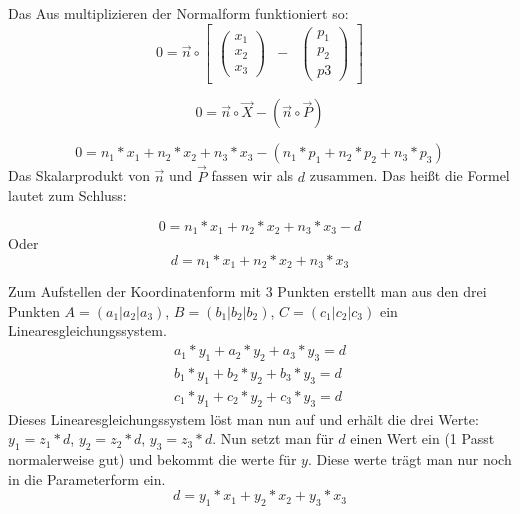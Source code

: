 \documentclass{article}
\begin{document}
Das Aus multiplizieren der Normalform funktioniert so:
\begin{equation}
0 = \vec{n} \circ \begin{bmatrix} \begin{pmatrix} x_1 \\ x_2 \\ x_3 \end{pmatrix} &  - &  \begin{pmatrix} p_1 \\ p_2 \\ p3 \end{pmatrix} \end{bmatrix}
\end{equation}

\begin{equation}
0 = \vec{n} \circ \vec{X} - (\vec{n} \circ \vec{P})
\end{equation}

\begin{equation}
0 = n_1 * x_1 + n_2 * x_2 + n_3 * x_3 - (n_1 * p_1 + n_2 * p_2 + n_3 * p_3)
\end{equation}
Das Skalarprodukt von $\vec{n}$ und $\vec{P}$ fassen wir als $d$ zusammen. Das heißt die Formel lautet zum Schluss:

\begin{equation}
0 = n_1 * x_1 + n_2 * x_2 + n_3 * x_3 - d
\end{equation}
Oder
\begin{equation}
d = n_1 * x_1 + n_2 * x_2 + n_3 * x_3
\end{equation}

Zum Aufstellen der Koordinatenform mit 3 Punkten erstellt man aus den drei Punkten $A = (a_1 | a_2 | a_3)$, $B = (b_1 | b_2 | b_2)$, $C = (c_1 | c_2 | c_3)$ ein Linearesgleichungssystem.
\begin{equation}
\begin{matrix}
a_1 * y_1 + a_2 * y_2 + a_3 * y_3 = d \\
b_1 * y_1 + b_2 * y_2 + b_3 * y_3 = d \\
c_1 * y_1 + c_2 * y_2 + c_3 * y_3 = d
\end{matrix}
\end{equation}
Dieses Linearesgleichungssystem löst man nun auf und erhält die drei Werte: $y_1 = z_1 * d$, $y_2 = z_2 * d$, $y_3 = z_3 * d$. Nun setzt man für $d$ einen Wert ein (1 Passt normalerweise gut) und bekommt die werte für $y$. Diese werte trägt man nur noch in die Parameterform ein.
\begin{equation}
d = y_1 * x_1 + y_2 * x_2 + y_3 * x_3
\end{equation}
\end{document}
